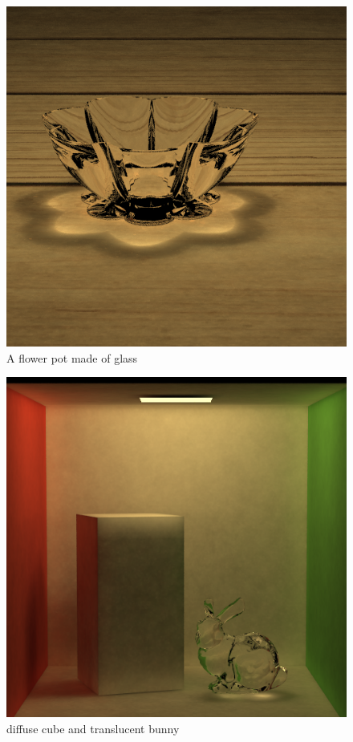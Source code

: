 \documentclass[acmtog]{acmart}
\begin{document}
	\begin{figure}[h]
		\centering
		\includegraphics[scale=0.3]{Images/output_20round_photon500000.png}
		\caption{A flower pot made of glass}
	\end{figure}		
	\begin{figure}[h]
		\centering
		\includegraphics[scale=0.3]{Images/output_spp10.png}
		\caption{diffuse cube and translucent bunny}
	\end{figure}
\end{document}
